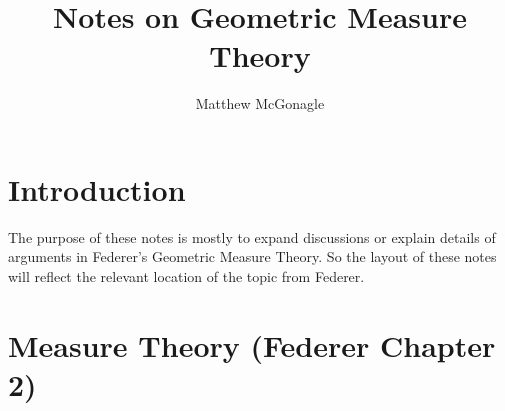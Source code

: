 \documentclass{article}
\begin{document}
\title{Notes on Geometric Measure Theory}
\author{Matthew McGonagle}
\maketitle
\section{Introduction}
The purpose of these notes is mostly to expand discussions or explain details of arguments
in Federer's Geometric Measure Theory. So the layout of these notes will reflect the relevant location
of the topic from Federer.

\section{Measure Theory (Federer Chapter 2)}

\end{document}
